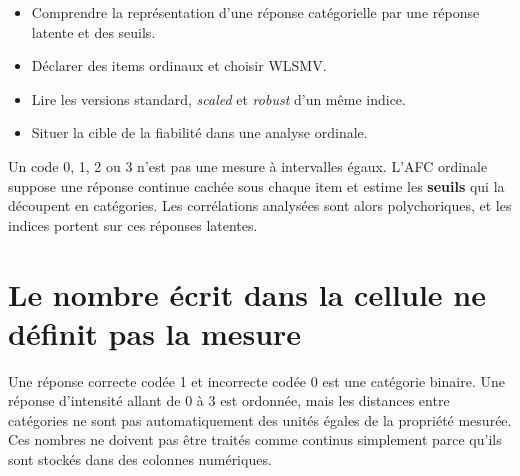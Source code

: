 \documentclass[
  french,
  11pt,
  a4paper,
  DIV=11,
  numbers=noendperiod]{scrreprt}
\providecommand{\tightlist}{%
  \setlength{\itemsep}{0pt}\setlength{\parskip}{0pt}}
\begin{document}
\begin{tcolorbox}[enhanced jigsaw, arc=.35mm, bottomrule=.15mm, bottomtitle=1mm, breakable, colback=white, colbacktitle=quarto-callout-note-color!10!white, colframe=quarto-callout-note-color-frame, coltitle=black, left=2mm, leftrule=.75mm, opacityback=0, opacitybacktitle=0.6, rightrule=.15mm, title={Objectifs du chapitre}, titlerule=0mm, toprule=.15mm, toptitle=1mm]

\begin{itemize}
\tightlist
\item
  Comprendre la représentation d'une réponse catégorielle par une
  réponse latente et des seuils.
\item
  Déclarer des items ordinaux et choisir WLSMV.
\item
  Lire les versions standard, \emph{scaled} et \emph{robust} d'un même
  indice.
\item
  Situer la cible de la fiabilité dans une analyse ordinale.
\end{itemize}

\end{tcolorbox}

\begin{tcolorbox}[enhanced jigsaw, arc=.35mm, bottomrule=.15mm, bottomtitle=1mm, breakable, colback=white, colbacktitle=quarto-callout-tip-color!10!white, colframe=quarto-callout-tip-color-frame, coltitle=black, left=2mm, leftrule=.75mm, opacityback=0, opacitybacktitle=0.6, rightrule=.15mm, title={Idée centrale}, titlerule=0mm, toprule=.15mm, toptitle=1mm]

Un code 0, 1, 2 ou 3 n'est pas une mesure à intervalles égaux. L'AFC
ordinale suppose une réponse continue cachée sous chaque item et estime
les \textbf{seuils} qui la découpent en catégories. Les corrélations
analysées sont alors polychoriques, et les indices portent sur ces
réponses latentes.

\end{tcolorbox}

\section{Le nombre écrit dans la cellule ne définit pas la
mesure}\label{le-nombre-uxe9crit-dans-la-cellule-ne-duxe9finit-pas-la-mesure}

Une réponse correcte codée 1 et incorrecte codée 0 est une catégorie
binaire. Une réponse d'intensité allant de 0 à 3 est ordonnée, mais les
distances entre catégories ne sont pas automatiquement des unités égales
de la propriété mesurée. Ces nombres ne doivent pas être traités comme
continus simplement parce qu'ils sont stockés dans des colonnes
numériques.
\end{document}

